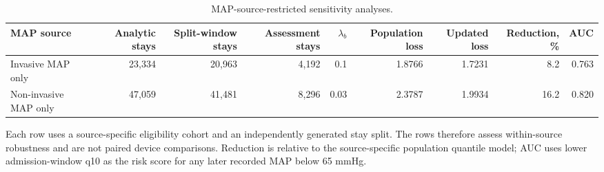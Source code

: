 \begin{table}[!htbp]
\caption{MAP-source-restricted sensitivity analyses.}
\label{tab:map_source_sensitivity}
\centering
\small
\setlength{\tabcolsep}{4pt}
\begin{tabular}{lrrrrrrrr}
\toprule
MAP source & Analytic stays & Split-window stays & Assessment stays & $\lambda_b$ & Population loss & Updated loss & Reduction, \% & AUC\\
\midrule
Invasive MAP only & 23,334 & 20,963 & 4,192 & 0.1 & 1.8766 & 1.7231 & 8.2 & 0.763\\
Non-invasive MAP only & 47,059 & 41,481 & 8,296 & 0.03 & 2.3787 & 1.9934 & 16.2 & 0.820\\
\bottomrule
\end{tabular}
\par\smallskip
\footnotesize{Each row uses a source-specific eligibility cohort and an independently generated stay split. The rows therefore assess within-source robustness and are not paired device comparisons. Reduction is relative to the source-specific population quantile model; AUC uses lower admission-window q10 as the risk score for any later recorded MAP below 65 mmHg.}
\end{table}
